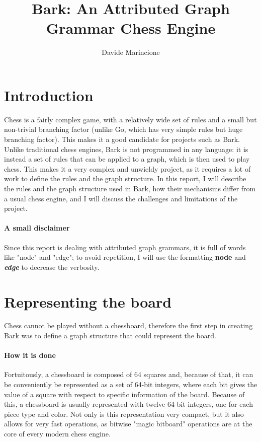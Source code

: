 \documentclass[twocolumn, a4paper]{scrartcl}
\title{Bark: An Attributed Graph Grammar Chess Engine}
\author{Davide Marincione}
\newcommand{\noderepr}[1]{\textsf{\textbf{#1}}}
\newcommand{\edgerepr}[1]{\textit{\textbf{#1}}}
\begin{document}
    \maketitle
    \section{Introduction}
    Chess is a fairly complex game, with a relatively wide set of rules and a small but non-trivial branching factor (unlike Go, which has very simple rules but huge branching factor). This makes it a good candidate for projects such as Bark. Unlike traditional chess engines, Bark is not programmed in any language: it is instead a set of rules that can be applied to a graph, which is then used to play chess. This makes it a very complex and unwieldy project, as it requires a lot of work to define the rules and the graph structure. In this report, I will describe the rules and the graph structure used in Bark, how their mechanisms differ from a usual chess engine, and I will discuss the challenges and limitations of the project.

    \paragraph{A small disclaimer} Since this report is dealing with attributed graph grammars, it is full of words like "node" and "edge"; to avoid repetition, I will use the formatting \noderepr{node} and \edgerepr{edge} to decrease the verbosity.

    \section{Representing the board}
    Chess cannot be played without a chessboard, therefore the first step in creating Bark was to define a graph structure that could represent the board.
    \paragraph{How it is done} Fortuitously, a chessboard is composed of 64 squares and, because of that, it can be conveniently be represented as a set of 64-bit integers, where each bit gives the value of a square with respect to specific information of the board. Because of this, a chessboard is usually represented with twelve 64-bit integers, one for each piece type and color. Not only is this representation very compact, but it also allows for very fast operations, as bitwise "magic bitboard" operations are at the core of every modern chess engine.
\end{document}

